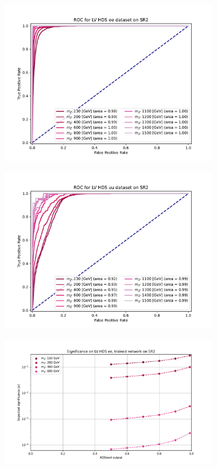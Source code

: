 \documentclass[12pt, a4paper]{book}
\begin{document}
\begin{figure}[!ht]
\begin{subfigure}[b]{0.49\textwidth}
      \includegraphics[width=1\textwidth]{XGBoost/Model_independent/100-150/LV_HDS/ROC_ee.pdf}
   \end{subfigure}
   \hfill
   \begin{subfigure}[b]{0.49\textwidth}
      \centering
      \includegraphics[width=1\textwidth]{XGBoost/Model_independent/100-150/LV_HDS/ROC_uu.pdf}
   \end{subfigure}
   \hfill
	\begin{subfigure}[b]{0.49\textwidth}
      \centering
      \includegraphics[width=1\textwidth]{XGBoost/Model_independent/100-150/LV_HDS/EXP_SIG_ee.pdf}

\end{subfigure}
\end{figure}
\end{document}
